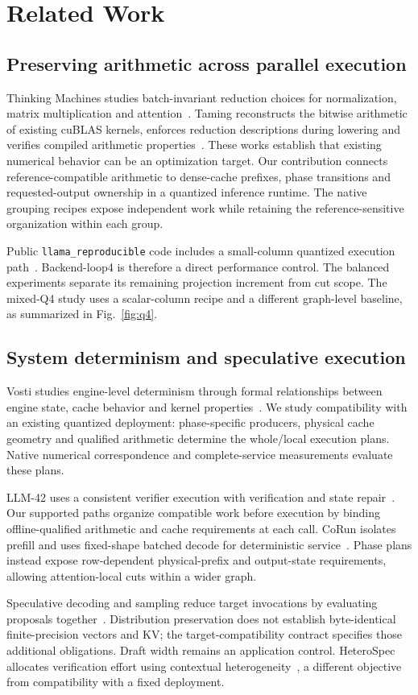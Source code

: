 \section{Related Work}
\label{sec:related}
\subsection{Preserving arithmetic across parallel execution}
Thinking Machines studies batch-invariant reduction choices for normalization, matrix multiplication and attention~\cite{thinkingmachines}. Taming reconstructs the bitwise arithmetic of existing cuBLAS kernels, enforces reduction descriptions during lowering and verifies compiled arithmetic properties~\cite{taming}. These works establish that existing numerical behavior can be an optimization target. Our contribution connects reference-compatible arithmetic to dense-cache prefixes, phase transitions and requested-output ownership in a quantized inference runtime. The native grouping recipes expose independent work while retaining the reference-sensitive organization within each group.

Public \texttt{llama\_reproducible} code includes a small-column quantized execution path~\cite{loop4code}. Backend-loop4 is therefore a direct performance control. The balanced experiments separate its remaining projection increment from cut scope. The mixed-Q4 study uses a scalar-column recipe and a different graph-level baseline, as summarized in Fig.~\ref{fig:q4}.

\subsection{System determinism and speculative execution}
Vosti studies engine-level determinism through formal relationships between engine state, cache behavior and kernel properties~\cite{vosti}. We study compatibility with an existing quantized deployment: phase-specific producers, physical cache geometry and qualified arithmetic determine the whole/local execution plans. Native numerical correspondence and complete-service measurements evaluate these plans.

LLM-42 uses a consistent verifier execution with verification and state repair~\cite{llm42}. Our supported paths organize compatible work before execution by binding offline-qualified arithmetic and cache requirements at each call. CoRun isolates prefill and uses fixed-shape batched decode for deterministic service~\cite{corun}. Phase plans instead expose row-dependent physical-prefix and output-state requirements, allowing attention-local cuts within a wider graph.

Speculative decoding and sampling reduce target invocations by evaluating proposals together~\cite{leviathan2023,chen2023}. Distribution preservation does not establish byte-identical finite-precision vectors and KV; the target-compatibility contract specifies those additional obligations. Draft width remains an application control. HeteroSpec allocates verification effort using contextual heterogeneity~\cite{liu2026heterospec}, a different objective from compatibility with a fixed deployment.